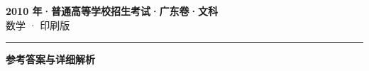 \documentclass[zihao=5, a4paper]{ctexart}
\begin{document}
\begin{center}
  {\Large\bfseries 2010 年·普通高等学校招生考试·广东卷·文科}\\[4pt]
  {\large 数学 · 印刷版}
\end{center}
\medskip
{}

\par\bigskip\hrule\bigskip
{}
\begin{center}{\large\bfseries 参考答案与详细解析}\end{center}
\smallskip

\end{document}
